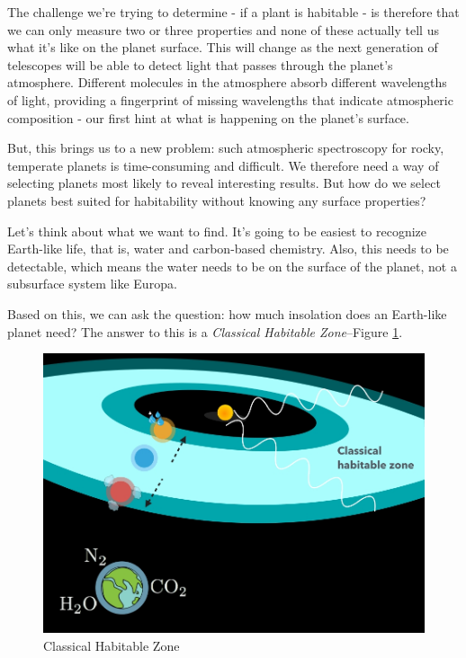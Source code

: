 \documentclass[]{article}
\begin{document}
The challenge we're trying to determine -
if a plant is habitable -
is therefore that we can only measure
two or three properties
and none of these actually tell us
what it's like on the planet surface.
This will change as
the next generation of telescopes
will be able to detect light that passes
through the planet's atmosphere.
Different molecules in the atmosphere
absorb different wavelengths of light,
providing a fingerprint
of missing wavelengths
that indicate atmospheric composition -
our first hint at what is happening
on the planet's surface.

But, this brings us to a new problem:
such atmospheric spectroscopy
for rocky, temperate planets
is time-consuming and difficult.
We therefore need a way
of selecting planets
most likely to reveal interesting results.
But how do we select planets
best suited for habitability
without knowing any surface properties?

Let's think about what we want to find.
It's going to be easiest
to recognize Earth-like life,
that is, water and
carbon-based chemistry.
Also, this needs to be detectable,
which means the water needs to be
on the surface of the planet,
not a subsurface system like Europa.

Based on this, we can ask the question:
how much insolation
does an Earth-like planet need?
The answer to this is
a \emph{Classical Habitable Zone}--Figure \ref{fig:classical:habitable:zone}.

\begin{figure}[H]
	\caption{Classical Habitable Zone}\label{fig:classical:habitable:zone}
	\includegraphics[width=\textwidth]{ClassicalHabitableZone}
\end{figure}
\end{document}

